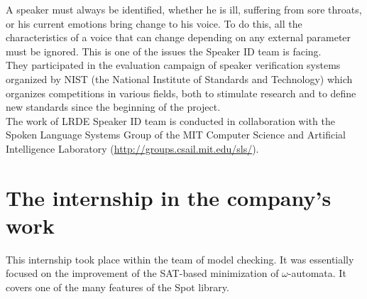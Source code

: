 A speaker must always be identified, whether he is ill, suffering from sore throats, or his
current emotions bring change to his voice. To do this, all the characteristics of a voice that can change
depending on any external parameter must be ignored. This is one of the issues the Speaker ID team is
facing.\\

They participated in the evaluation campaign of speaker verification systems organized by NIST
(the National Institute of Standards and Technology) which organizes competitions in various fields, both
to stimulate research and to define new standards since the beginning of the project.\\

The work of LRDE Speaker ID team is conducted in collaboration with the Spoken Language Systems Group of
the MIT Computer Science and Artificial Intelligence Laboratory (\url{http://groups.csail.mit.edu/sls/}).


\section{The internship in the company's work}
This internship took place within the team of model checking. It was essentially focused on
the improvement of the SAT-based minimization of $\omega$-automata. It covers one of the many
features of the Spot library.